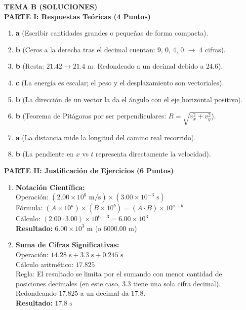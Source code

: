 \documentclass[9pt]{article}
\begin{document}
\begin{minipage}[t]{0.48\textwidth}
    \centering \textbf{\large TEMA B (SOLUCIONES)} \\
    \vspace{0.2cm}
    \flushleft
    \textbf{PARTE I: Respuestas Teóricas (4 Puntos)}
    \begin{enumerate}
        \item \textbf{a} (Escribir cantidades grandes o pequeñas de forma compacta).
        \item \textbf{b} (Ceros a la derecha tras el decimal cuentan: 9, 0, 4, 0 $\rightarrow$ 4 cifras).
        \item \textbf{b} (Resta: $21.42 \rightarrow 21.4\text{ m}$. Redondeado a un decimal debido a $24.6$).
        \item \textbf{c} (La energía es escalar; el peso y el desplazamiento son vectoriales).
        \item \textbf{b} (La dirección de un vector la da el ángulo con el eje horizontal positivo).
        \item \textbf{b} (Teorema de Pitágoras por ser perpendiculares: $R = \sqrt{v_x^2 + v_y^2}$).
        \item \textbf{a} (La distancia mide la longitud del camino real recorrido).
        \item \textbf{b} (La pendiente en $x$ vs $t$ representa directamente la velocidad).
    \end{enumerate}

    \vspace{0.2cm}
    \textbf{PARTE II: Justificación de Ejercicios (6 Puntos)}
    \begin{enumerate}
        \item \textbf{Notación Científica:} \\
        Operación: $(2.00 \times 10^6\text{ m/s}) \times (3.00 \times 10^{-3}\text{ s})$ \\
        Fórmula: $(A \times 10^a) \times (B \times 10^b) = (A \cdot B) \times 10^{a+b}$ \\
        Cálculo: $(2.00 \cdot 3.00) \times 10^{6 - 3} = 6.00 \times 10^3$ \\
        \textbf{Resultado: } $6.00 \times 10^3\text{ m}$ (o $6000.00\text{ m}$)
        
        \item \textbf{Suma de Cifras Significativas:} \\
        Operación: $14.28\text{ s} + 3.3\text{ s} + 0.245\text{ s}$ \\
        Cálculo aritmético: $17.825$ \\
        Regla: El resultado se limita por el sumando con menor cantidad de posiciones decimales (en este caso, $3.3$ tiene una sola cifra decimal). Redondeando $17.825$ a un decimal da $17.8$. \\
        \textbf{Resultado: } $17.8\text{ s}$
        

\end{enumerate}
\end{minipage}
\end{document}
